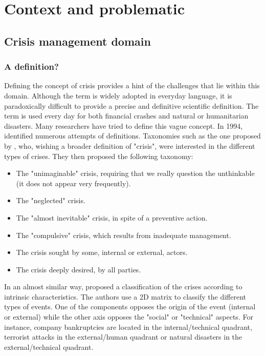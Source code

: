 \chapter{Context and problematic}

\section{Crisis management domain}
\subsection{A definition?}
Defining the concept of crisis provides a hint of the challenges that lie within this domain.
Although the term is widely adopted in everyday language, it is paradoxically difficult to provide a precise and definitive scientific definition.
The term is used every day for both financial crashes and natural or humanitarian disasters.
Many researchers have tried to define this vague concept.
In 1994, \textcite{lagadecGESTIONCRISES1994} identified numerous attempts of definitions.
Taxonomies such as the one proposed by \textcite{rosenthalCrisisDecisionMakingNetherlands1986}, who, wishing a broader definition of "crisis", were interested in the different types of crises.
They then proposed the following taxonomy:
\begin{itemize}
    \item The "unimaginable" crisis, requiring that we really question the unthinkable (it does not appear very frequently).
    \item The "neglected" crisis.
    \item The "almost inevitable" crisis, in spite of a preventive action.
    \item The "compulsive" crisis, which results from inadequate management.
    \item The crisis sought by some, internal or external, actors.
    \item The crisis deeply desired, by all parties.
\end{itemize}
In an almost similar way, \textcite{mitroffStructureManmadeOrganizational1988} proposed a classification of the crises according to intrinsic characteristics.
The authors use a 2D matrix to classify the different types of events.
One of the components opposes the origin of the event (internal or external) while the other axis opposes the "social" or "technical" aspects.
For instance, company bankruptcies are located in the internal/technical quadrant, terrorist attacks in the external/human quadrant or natural disasters in the external/technical quadrant.
